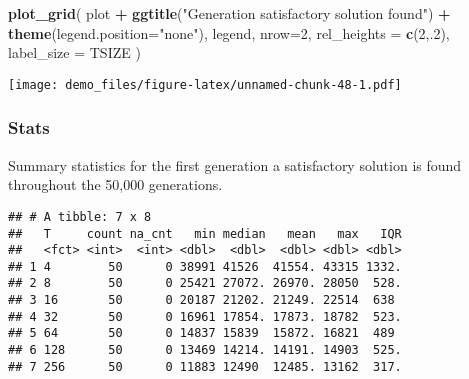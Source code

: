 \documentclass[]{book}
\newenvironment{Shaded}{\begin{snugshade}}{\end{snugshade}}
\newcommand{\DataTypeTok}[1]{\textcolor[rgb]{0.13,0.29,0.53}{#1}}
\newcommand{\DecValTok}[1]{\textcolor[rgb]{0.00,0.00,0.81}{#1}}
\newcommand{\KeywordTok}[1]{\textcolor[rgb]{0.13,0.29,0.53}{\textbf{#1}}}
\newcommand{\NormalTok}[1]{#1}
\newcommand{\OperatorTok}[1]{\textcolor[rgb]{0.81,0.36,0.00}{\textbf{#1}}}
\newcommand{\OtherTok}[1]{\textcolor[rgb]{0.56,0.35,0.01}{#1}}
\newcommand{\StringTok}[1]{\textcolor[rgb]{0.31,0.60,0.02}{#1}}
\begin{document}
\begin{Shaded}
\begin{Highlighting}[]
\KeywordTok{plot_grid}\NormalTok{(}
\NormalTok{  plot }\OperatorTok{+}
\StringTok{    }\KeywordTok{ggtitle}\NormalTok{(}\StringTok{"Generation satisfactory solution found"}\NormalTok{) }\OperatorTok{+}
\StringTok{    }\KeywordTok{theme}\NormalTok{(}\DataTypeTok{legend.position=}\StringTok{"none"}\NormalTok{),}
\NormalTok{  legend,}
  \DataTypeTok{nrow=}\DecValTok{2}\NormalTok{,}
  \DataTypeTok{rel_heights =} \KeywordTok{c}\NormalTok{(}\DecValTok{2}\NormalTok{,.}\DecValTok{2}\NormalTok{),}
  \DataTypeTok{label_size =}\NormalTok{ TSIZE}
\NormalTok{)}
\end{Highlighting}
\end{Shaded}

\texttt{[image: demo\_files/figure-latex/unnamed-chunk-48-1.pdf]}

\hypertarget{stats-30}{%
\subsubsection{Stats}\label{stats-30}}

Summary statistics for the first generation a satisfactory solution is found throughout the 50,000 generations.

\begin{Shaded}
\end{Shaded}

\begin{verbatim}
## # A tibble: 7 x 8
##   T     count na_cnt   min median   mean   max   IQR
##   <fct> <int>  <int> <dbl>  <dbl>  <dbl> <dbl> <dbl>
## 1 4        50      0 38991 41526  41554. 43315 1332.
## 2 8        50      0 25421 27072. 26970. 28050  528.
## 3 16       50      0 20187 21202. 21249. 22514  638 
## 4 32       50      0 16961 17854. 17873. 18782  523.
## 5 64       50      0 14837 15839  15872. 16821  489 
## 6 128      50      0 13469 14214. 14191. 14903  525.
## 7 256      50      0 11883 12490  12485. 13162  317.
\end{verbatim}
\end{document}
